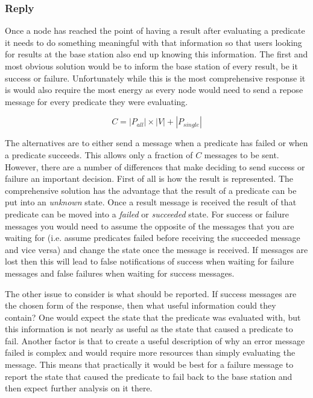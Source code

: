 \subsubsection{Reply}

Once a node has reached the point of having a result after evaluating a predicate it needs to do something meaningful with that information so that users looking for results at the base station also end up knowing this information. The first and most obvious solution would be to inform the base station of every result, be it success or failure. Unfortunately while this is the most comprehensive response it is would also require the most energy as every node would need to send a repose message for every predicate they were evaluating.

\begin{equation}
C = |P_{all}| \times |V| + |P_{single}|
\end{equation}

The alternatives are to either send a message when a predicate has failed or when a predicate succeeds. This allows only a fraction of $C$ messages to be sent. However, there are a number of differences that make deciding to send success or failure an important decision. First of all is how the result is represented. The comprehensive solution has the advantage that the result of a predicate can be put into an \emph{unknown} state. Once a result message is received the result of that predicate can be moved into a \emph{failed} or \emph{succeeded} state. For success or failure messages you would need to assume the opposite of the messages that you are waiting for (i.e. assume predicates failed before receiving the succeeded message and vice versa) and change the state once the message is received. If messages are lost then this will lead to false notifications of success when waiting for failure messages and false failures when waiting for success messages.

The other issue to consider is what should be reported. If success messages are the chosen form of the response, then what useful information could they contain? One would expect the state that the predicate was evaluated with, but this information is not nearly as useful as the state that caused a predicate to fail. Another factor is that to create a useful description of why an error message failed is complex and would require more resources than simply evaluating the message. This means that practically it would be best for a failure message to report the state that caused the predicate to fail back to the base station and then expect further analysis on it there.

